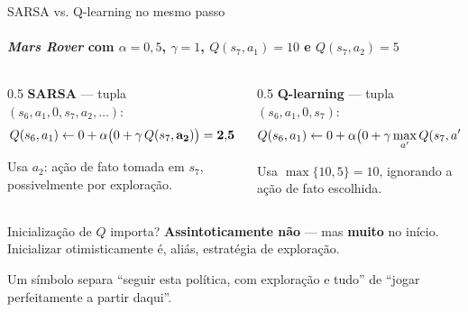 \documentclass[aspectratio=169, 11pt]{beamer}
\begin{document}
\begin{frame}{SARSA {\normalfont vs.} Q-learning no mesmo passo}
  \framesubtitle{\emph{Mars Rover} com $\alpha = 0{,}5$, $\gamma = 1$, $Q(s_7,a_1) = 10$ e $Q(s_7,a_2) = 5$}

  \begin{columns}[T]
    \begin{column}{0.5\textwidth}
      \textbf{SARSA} --- tupla $(s_6, a_1, 0, s_7, a_2, \dots)$:
      \vspace{-0.4em}
      \[ \small Q(s_6,a_1) \leftarrow 0 + \alpha\bigl(0 + \gamma\, Q(s_7,\mathbf{a_2})\bigr) = \mathbf{2{,}5} \]
      \vspace{-1.5em}

      {\footnotesize Usa $a_2$: ação de fato tomada em $s_7$,
      possivelmente por exploração.}
    \end{column}
    \begin{column}{0.5\textwidth}
      \textbf{Q-learning} --- tupla $(s_6, a_1, 0, s_7)$:
      \vspace{-0.4em}
      \[ \small Q(s_6,a_1) \leftarrow 0 + \alpha\bigl(0 + \gamma \max_{a'} Q(s_7,a')\bigr) = \mathbf{5} \]
      \vspace{-1.5em}

      {\footnotesize Usa $\max\{10,5\} = 10$, ignorando a ação de fato
      escolhida.}
    \end{column}
  \end{columns}

  \begin{alertabox}
    Inicialização de $Q$ importa? \textbf{Assintoticamente não} — mas
    \textbf{muito} no início. Inicializar otimisticamente é, aliás,
    estratégia de exploração.
  \end{alertabox}

  \begin{ideiabox}
    Um símbolo separa ``seguir esta política, com exploração e tudo'' de
    ``jogar perfeitamente a partir daqui''.
  \end{ideiabox}
\end{frame}
\end{document}
